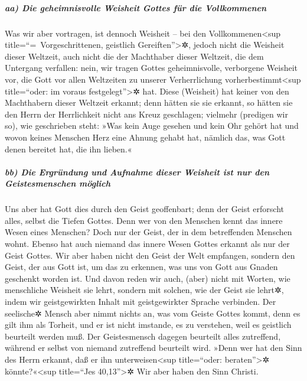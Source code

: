 \hypertarget{aa-die-geheimnisvolle-weisheit-gottes-fuxfcr-die-vollkommenen}{%
\subparagraph{aa) Die geheimnisvolle Weisheit Gottes für die
Vollkommenen}\label{aa-die-geheimnisvolle-weisheit-gottes-fuxfcr-die-vollkommenen}}

 Was wir aber vortragen, ist dennoch Weisheit -- bei den
Vollkommenen\textless sup title=``=~Vorgeschrittenen, geistlich
Gereiften''\textgreater✲, jedoch nicht die Weisheit dieser Weltzeit,
auch nicht die der Machthaber dieser Weltzeit, die dem Untergang
verfallen:  nein, wir tragen Gottes geheimnisvolle,
verborgene Weisheit vor, die Gott vor allen Weltzeiten zu unserer
Verherrlichung vorherbestimmt\textless sup title=``oder: im voraus
festgelegt''\textgreater✲ hat.  Diese (Weisheit) hat
keiner von den Machthabern dieser Weltzeit erkannt; denn hätten sie sie
erkannt, so hätten sie den Herrn der Herrlichkeit nicht ans Kreuz
geschlagen;  vielmehr (predigen wir so), wie geschrieben
steht: »Was kein Auge gesehen und kein Ohr gehört hat und wovon keines
Menschen Herz eine Ahnung gehabt hat, nämlich das, was Gott denen
bereitet hat, die ihn lieben.«

\hypertarget{bb-die-ergruxfcndung-und-aufnahme-dieser-weisheit-ist-nur-den-geistesmenschen-muxf6glich}{%
\subparagraph{bb) Die Ergründung und Aufnahme dieser Weisheit ist nur
den Geistesmenschen
möglich}\label{bb-die-ergruxfcndung-und-aufnahme-dieser-weisheit-ist-nur-den-geistesmenschen-muxf6glich}}

 Uns aber hat Gott dies durch den Geist geoffenbart; denn
der Geist erforscht alles, selbst die Tiefen Gottes. 
Denn wer von den Menschen kennt das innere Wesen eines Menschen? Doch
nur der Geist, der in dem betreffenden Menschen wohnt. Ebenso hat auch
niemand das innere Wesen Gottes erkannt als nur der Geist Gottes.
 Wir aber haben nicht den Geist der Welt empfangen,
sondern den Geist, der aus Gott ist, um das zu erkennen, was uns von
Gott aus Gnaden geschenkt worden ist.  Und davon reden
wir auch, (aber) nicht mit Worten, wie menschliche Weisheit sie lehrt,
sondern mit solchen, wie der Geist sie lehrt✲, indem wir geistgewirkten
Inhalt mit geistgewirkter Sprache verbinden.  Der
seelische✲ Mensch aber nimmt nichts an, was vom Geiste Gottes kommt,
denn es gilt ihm als Torheit, und er ist nicht imstande, es zu
verstehen, weil es geistlich beurteilt werden muß.  Der
Geistesmensch dagegen beurteilt alles zutreffend, während er selbst von
niemand zutreffend beurteilt wird.  »Denn wer hat den
Sinn des Herrn erkannt, daß er ihn unterweisen\textless sup
title=``oder: beraten''\textgreater✲ könnte?«\textless sup title=``Jes
40,13''\textgreater✲ Wir aber haben den Sinn Christi.

